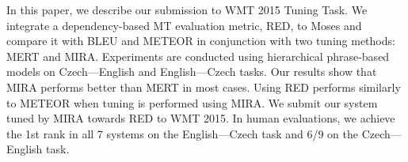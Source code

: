 In this paper, we describe our submission to WMT 2015 Tuning Task. We integrate a dependency-based MT evaluation metric, RED, to Moses and compare it with BLEU and METEOR in conjunction with two tuning methods: MERT and MIRA. Experiments are conducted using hierarchical phrase-based models on Czech---English and English---Czech tasks. Our results show that MIRA performs better than MERT in most cases. Using RED performs similarly to METEOR when tuning is performed using MIRA. We submit our system tuned by MIRA towards RED to WMT 2015. In human evaluations, we achieve the 1st rank in all 7 systems on the English---Czech task and 6/9 on the Czech---English task.

